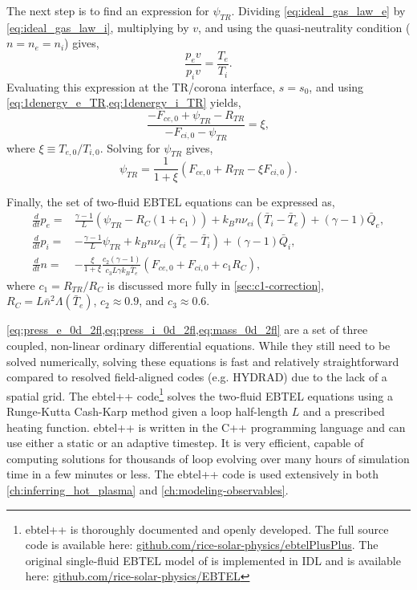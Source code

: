 The next step is to find an expression for $\psi_{TR}$. Dividing \autoref{eq:ideal_gas_law_e} by \autoref{eq:ideal_gas_law_i}, multiplying by $v$, and using the quasi-neutrality condition ($n=n_e=n_i$) gives,
\begin{equation}
    \frac{p_ev}{p_iv} = \frac{T_e}{T_i}.
\end{equation}
Evaluating this expression at the TR/corona interface, $s=s_0$, and using \autoref{eq:1denergy_e_TR,eq:1denergy_i_TR} yields,
\begin{equation}
    \frac{- F_{ce,0} + \psi_{TR} - R_{TR}}{- F_{ci,0} - \psi_{TR}} = \xi,
\end{equation}
where $\xi\equiv T_{e,0}/T_{i,0}$. Solving for $\psi_{TR}$ gives,
\begin{equation}\label{eq:psi_TR}
    \psi_{TR} = \frac{1}{1+\xi}(F_{ce,0} + R_{TR} - \xi F_{ci,0}).
\end{equation}

Finally, the set of two-fluid EBTEL equations can be expressed as,
\begin{align}
    \frac{d}{dt}p_e =& \frac{\gamma - 1}{L}(\psi_{TR} - R_C(1 + c_1)) + k_Bn\nu_{ei}(\bar{T}_i - \bar{T}_e) + (\gamma - 1)\bar{Q}_e,\label{eq:press_e_0d_2fl} \\
    \frac{d}{dt}p_i =& -\frac{\gamma - 1}{L}\psi_{TR} + k_Bn\nu_{ei}(\bar{T}_e - \bar{T}_i) + (\gamma - 1)\bar{Q}_i,\label{eq:press_i_0d_2fl} \\
    \frac{d}{dt}n =& -\frac{\xi}{1+\xi}\frac{c_2(\gamma - 1)}{c_3L\gamma k_B\bar{T}_e}(F_{ce,0} + F_{ci,0} + c_1R_C),\label{eq:mass_0d_2fl}
\end{align}
where $c_1=R_{TR}/R_C$ is discussed more fully in \autoref{sec:c1-correction}, $R_C=L\bar{n}^2\Lambda(\bar{T}_e)$, $c_2\approx0.9$, and $c_3\approx0.6$.

\autoref{eq:press_e_0d_2fl,eq:press_i_0d_2fl,eq:mass_0d_2fl} are a set of three coupled, non-linear ordinary differential equations. While they still need to be solved numerically, solving these equations is fast and relatively straightforward compared to resolved field-aligned codes (e.g. HYDRAD) due to the lack of a spatial grid. The ebtel++ code\footnote{ebtel++ is thoroughly documented and openly developed. The full source code is available here: \href{https://github.com/rice-solar-physics/ebtelPlusPlus}{github.com/rice-solar-physics/ebtelPlusPlus}. The original single-fluid EBTEL model of \citet{klimchuk_highly_2008,cargill_enthalpy-based_2012} is implemented in IDL and is available here: \href{https://github.com/rice-solar-physics/EBTEL}{github.com/rice-solar-physics/EBTEL}} solves the two-fluid EBTEL equations using a Runge-Kutta Cash-Karp method \citep[Section 16.2]{press_numerical_1992} given a loop half-length $L$ and a prescribed heating function. ebtel++ is written in the C++ programming language and can use either a static or an adaptive timestep. It is very efficient, capable of computing solutions for thousands of loop evolving over many hours of simulation time in a few minutes or less. The ebtel++ code is used extensively in both \autoref{ch:inferring_hot_plasma} and \autoref{ch:modeling-observables}.

